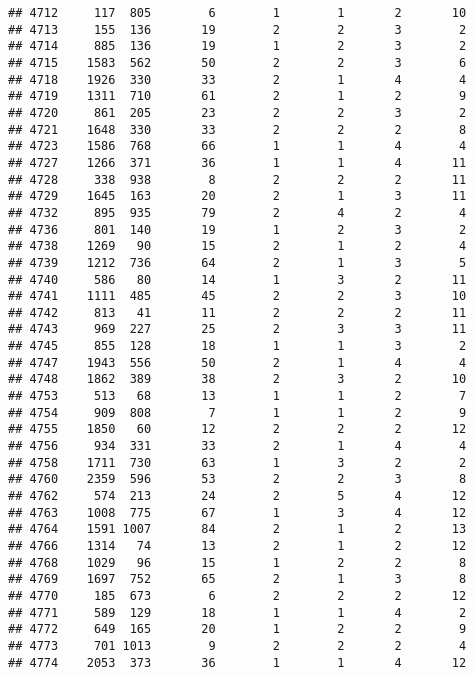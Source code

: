 \documentclass[]{article}
\begin{document}
\begin{verbatim}
## 4712     117  805        6        1        1       2       10
## 4713     155  136       19        2        2       3        2
## 4714     885  136       19        1        2       3        2
## 4715    1583  562       50        2        2       3        6
## 4718    1926  330       33        2        1       4        4
## 4719    1311  710       61        2        1       2        9
## 4720     861  205       23        2        2       3        2
## 4721    1648  330       33        2        2       2        8
## 4723    1586  768       66        1        1       4        4
## 4727    1266  371       36        1        1       4       11
## 4728     338  938        8        2        2       2       11
## 4729    1645  163       20        2        1       3       11
## 4732     895  935       79        2        4       2        4
## 4736     801  140       19        1        2       3        2
## 4738    1269   90       15        2        1       2        4
## 4739    1212  736       64        2        1       3        5
## 4740     586   80       14        1        3       2       11
## 4741    1111  485       45        2        2       3       10
## 4742     813   41       11        2        2       2       11
## 4743     969  227       25        2        3       3       11
## 4745     855  128       18        1        1       3        2
## 4747    1943  556       50        2        1       4        4
## 4748    1862  389       38        2        3       2       10
## 4753     513   68       13        1        1       2        7
## 4754     909  808        7        1        1       2        9
## 4755    1850   60       12        2        2       2       12
## 4756     934  331       33        2        1       4        4
## 4758    1711  730       63        1        3       2        2
## 4760    2359  596       53        2        2       3        8
## 4762     574  213       24        2        5       4       12
## 4763    1008  775       67        1        3       4       12
## 4764    1591 1007       84        2        1       2       13
## 4766    1314   74       13        2        1       2       12
## 4768    1029   96       15        1        2       2        8
## 4769    1697  752       65        2        1       3        8
## 4770     185  673        6        2        2       2       12
## 4771     589  129       18        1        1       4        2
## 4772     649  165       20        1        2       2        9
## 4773     701 1013        9        2        2       2        4
## 4774    2053  373       36        1        1       4       12

\end{verbatim}
\end{document}
